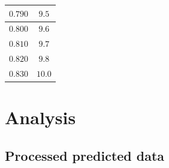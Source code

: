 \documentclass[letterpaper, 12pt]{article}
\begin{document}
\begin{longtable}{|c|c|}
    \hline
    $0.790$                                                                                                                                                                     & $9.5$                                                                                                                                                                                  \\
    \hline
    $0.800$                                                                                                                                                                     & $9.6$                                                                                                                                                                                  \\
    \hline
    $0.810$                                                                                                                                                                     & $9.7$                                                                                                                                                                                  \\
    \hline
    $0.820$                                                                                                                                                                     & $9.8$                                                                                                                                                                                  \\
    \hline
    $0.830$                                                                                                                                                                     & $10.0$                                                                                                                                                                                 \\
    \hline
\end{longtable}


\section{Analysis}

\subsection{Processed predicted data}
\end{document}
